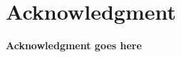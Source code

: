 \documentclass[conference]{IEEEtran}
\begin{document}



\section*{Acknowledgment}
\textbf{Acknowledgment goes here}\\
\lipsum[1-1]





\end{document}
